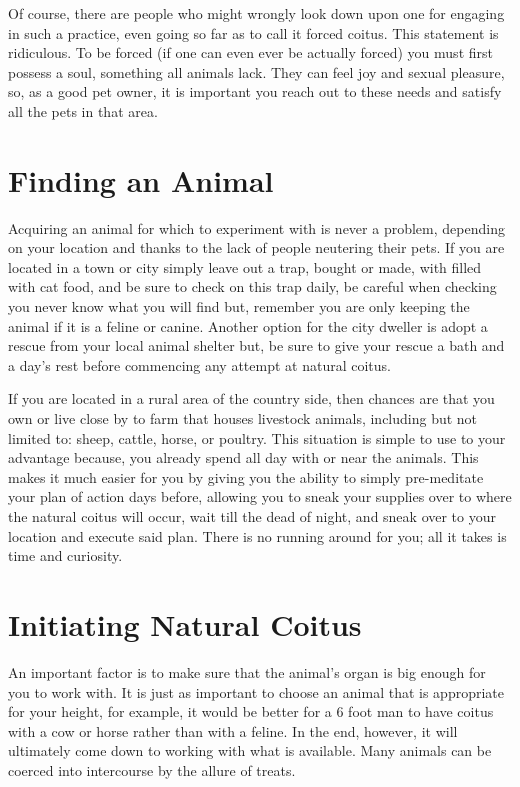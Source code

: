 Of course, there are people who might wrongly look down upon one for engaging in 
such a practice, even going so far as to call it forced coitus. This statement 
is ridiculous. To be forced (if one can even ever be actually forced) you must 
first possess a soul, something all animals lack. They can feel joy and sexual 
pleasure, so, as a good pet owner, it is important you reach out to these needs 
and satisfy all the pets in that area.

\section*{Finding an Animal}

       

    Acquiring an animal for which to experiment with is never a problem, 
depending on your location and thanks to the lack of people neutering their 
pets. If you are located in a town or city simply leave out a trap, bought or 
made, with filled with cat food, and be sure to check on this trap daily, be 
careful when checking you never know what you will find but, remember you are  
only keeping the animal if it is a feline or canine. Another option for the city 
dweller is adopt a rescue from your local animal shelter but, be sure to give 
your rescue a bath and a day’s rest before commencing any attempt at natural 
coitus.

           If you are located in a rural area of the country side, then chances 
are that you own or live close by to farm that houses livestock animals, 
including but not limited to: sheep, cattle, horse, or poultry. This situation 
is simple to use to your advantage because, you already spend all day with or 
near the animals. This makes it much easier for you by giving you the ability to 
simply pre-meditate your plan of action days before, allowing you to sneak your 
supplies over to where the natural coitus will occur, wait till the dead of 
night, and sneak over to your location and execute said plan. There is no 
running around for you; all it takes is time and curiosity.

   \section*{Initiating Natural Coitus}

An important factor is to make sure that the animal’s organ is big enough for 
you to work with. It is just as important to choose an animal that is 
appropriate for your height, for example, it would be better for a 6 foot man to 
have coitus with a cow or horse rather than with a feline. In the end, however, 
it will ultimately come down to working with what is available. Many animals can 
be coerced into intercourse by the allure of treats.

